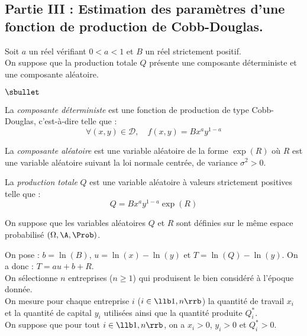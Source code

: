 \documentclass[11pt]{article}%
\begin{document}
\subsection*{Partie III : Estimation des paramètres d'une fonction de 
production de Cobb-Douglas.}
\noindent 
Soit $a$ un réel vérifiant $0 < a < 1$ et $B$ un réel 
strictement positif.\\
On suppose que la production totale $Q$ présente une composante 
déterministe et une composante aléatoire.
\begin{noliste}{$\sbullet$}
 \item La {\it composante déterministe} est une fonction de 
 production de type Cobb-Douglas, c'est-à-dire telle que :
 \[
  \forall (x,y) \in \mathcal{D},\quad f(x,y)=Bx^ay^{1-a}
 \]
 
 \item La {\it composante aléatoire} est une variable aléatoire de la 
 forme $\exp(R)$ où $R$ est une variable aléatoire suivant la loi 
 normale centrée, de variance $\sigma^2>0$.
 
 \item La {\it production totale} $Q$ est une variable aléatoire à 
 valeurs strictement positives telle que :
 \[
  Q=Bx^ay^{1-a} \exp(R)
 \]
\end{noliste}
On suppose que les variables aléatoires $Q$ et $R$ sont définies sur 
le même espace probabilisé $(\Omega,\A,\Prob)$.



\noindent
On pose : $b=\ln(B)$, $u=\ln(x) - \ln(y)$ et $T=\ln(Q)-\ln(y)$. On a 
donc : $T=au+b+R$.\\
On sélectionne $n$ entreprises ($n \geq 1$) qui produisent le bien 
considéré à l'époque donnée.\\
On mesure pour chaque entreprise $i$ ($i \in \llb 1,n \rrb$) la 
quantité de travail $x_i$ et la quantité de capital $y_i$ utilisées
ainsi que la quantité produite $Q_i^*$.\\
On suppose que pour tout $i \in \llb 1,n \rrb$, on a $x_i>0$, $y_i>0$ 
et $Q_i^*>0$.



\end{document}
